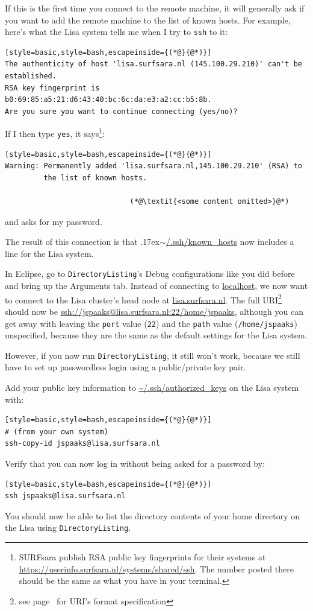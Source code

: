 \documentclass[12pt, a4paper, twoside, openany, titlepage]{book}
\newcommand{\mytilde}{\raise.17ex\hbox{$\scriptstyle\sim$}}
\begin{document}
If this is the first time you connect to the remote machine, it will generally ask if you want to add the remote machine to the list of known hosts. For example, here's what the Lisa system tells me when I try to \texttt{ssh} to it:
\begin{lstlisting}[style=basic,style=bash,escapeinside={(*@}{@*)}]
The authenticity of host 'lisa.surfsara.nl (145.100.29.210)' can't be
established.
RSA key fingerprint is b0:69:85:a5:21:d6:43:40:bc:6c:da:e3:a2:cc:b5:8b.
Are you sure you want to continue connecting (yes/no)?
\end{lstlisting}
If I then type \texttt{yes}, it says\footnote{SURFsara publish RSA public key fingerprints for their systems at \url{https://userinfo.surfsara.nl/systems/shared/ssh}. The number posted there should be the same as what you have in your terminal.}:
\begin{lstlisting}[style=basic,style=bash,escapeinside={(*@}{@*)}]
Warning: Permanently added 'lisa.surfsara.nl,145.100.29.210' (RSA) to
         the list of known hosts.

                             (*@\textit{<some content omitted>}@*)
\end{lstlisting}
and asks for my password.

The result of this connection is that \mytilde\url{/.ssh/known_hosts} now includes a line for the Lisa system.

In Eclipse, go to \texttt{DirectoryListing}'s \textsf{Debug configurations} like you did before and bring up the \textsf{Arguments} tab. Instead of connecting to \url{localhost}, we now want to connect to the Lisa cluster's head node at \url{lisa.surfsara.nl}. The full URI\footnote{see page~\pageref{footnote:format-uri} for URI's format specification} should now be \url{ssh://jspaaks@lisa.surfsara.nl:22/home/jspaaks}, although you can get away with leaving the \texttt{port} value (\texttt{22}) and the \texttt{path} value (\texttt{/home/jspaaks}) unspecified, because they are the same as the default settings for the Lisa system.

However, if you now run \texttt{DirectoryListing}, it still won't work, because we still have to set up passwordless login using a public/private key pair.

Add your public key information to \url{~/.ssh/authorized_keys} on the Lisa system with:
\begin{lstlisting}[style=basic,style=bash,escapeinside={(*@}{@*)}]
# (from your own system)
ssh-copy-id jspaaks@lisa.surfsara.nl
\end{lstlisting}
Verify that you can now log in without being asked for a password by:
\begin{lstlisting}[style=basic,style=bash,escapeinside={(*@}{@*)}]
ssh jspaaks@lisa.surfsara.nl
\end{lstlisting}
You should now be able to list the directory contents of your home directory on the Lisa using \texttt{DirectoryListing}.
\end{document}
